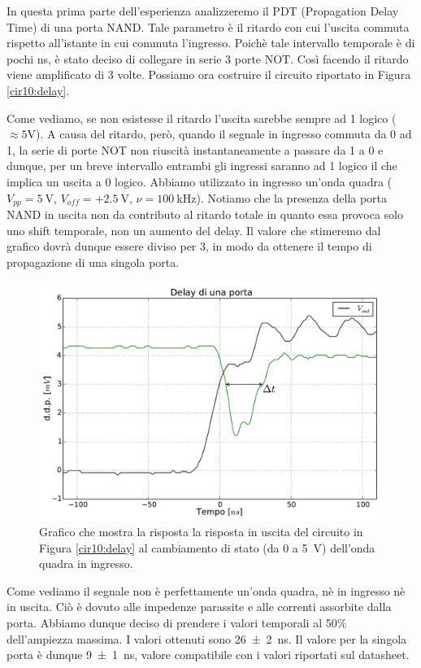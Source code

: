 In questa prima parte dell'esperienza analizzeremo il PDT (Propagation Delay Time) di una porta NAND.
Tale parametro è il ritardo con cui l'uscita commuta rispetto all'istante in cui commuta l'ingresso.
Poichè tale intervallo temporale è di pochi \si{\nano\second}, è stato deciso di collegare in serie 3 porte NOT.
Così facendo il ritardo viene amplificato di 3 volte.
Possiamo ora costruire il circuito riportato in Figura \ref{cir10:delay}.

Come vediamo, se non esistesse il ritardo l'uscita sarebbe sempre ad 1 logico ($\approx 5 \si{\volt}$).
A causa del ritardo, però, quando il segnale in ingresso commuta da 0 ad 1, la serie di porte NOT non riuscità instantaneamente a passare da 1 a 0 e dunque, per un breve intervallo entrambi gli ingressi saranno ad 1 logico il che implica un uscita a 0 logico.
Abbiamo utilizzato in ingresso un'onda quadra ($V_{pp}=\SI{5}{\volt}$, $V_{off}=+\SI{2.5}{\volt}$, $\nu=\SI{100}{\kilo\hertz}$).
Notiamo che la presenza della porta NAND in uscita non da contributo al ritardo totale in quanto essa provoca solo uno shift temporale, non un aumento del delay.
Il valore che stimeremo dal grafico dovrà dunque essere diviso per 3, in modo da ottenere il tempo di propagazione di una singola porta.

\begin{figure}[htpc]
\centering
\includegraphics[width=.65\textwidth]{../E10/latex/gdelay.pdf}
\caption{Grafico che mostra la risposta la risposta in uscita del circuito in Figura \ref{cir10:delay} al cambiamento di stato (da 0 a \SI{5}{\V}) dell'onda quadra in ingresso.}
\label{gr10:delay}
\end{figure}

Come vediamo il segnale non è perfettamente un'onda quadra, nè in ingresso nè in uscita.
Ciò è dovuto alle impedenze parassite e alle correnti assorbite dalla porta.
Abbiamo dunque deciso di prendere i valori temporali al 50\% dell'ampiezza massima.
I valori ottenuti sono \SI{26\pm 2}{\nano\second}.
Il valore per la singola porta è dunque \SI{9\pm 1}{\nano\second}, valore compatibile con i valori riportati sul datasheet.


